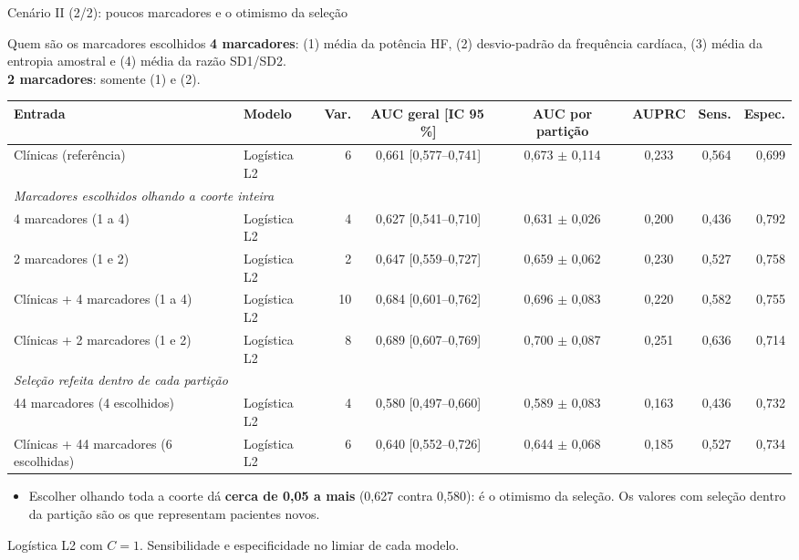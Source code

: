 \documentclass[10pt,aspectratio=169]{beamer}
\newcommand{\fonte}[1]{\par\vfill{\scriptsize\color{cinza}#1}}
\begin{document}
\begin{frame}{Cenário II (2/2): poucos marcadores e o otimismo da seleção}
  \begin{block}{Quem são os marcadores escolhidos}
    \footnotesize
    \textbf{4 marcadores}: (1) média da potência HF, (2) desvio-padrão da frequência cardíaca, (3) média da entropia amostral e (4) média da razão SD1/SD2.\\
    \textbf{2 marcadores}: somente (1) e (2).
  \end{block}
  \centering
  \scriptsize
  \setlength{\tabcolsep}{3pt}
  \begin{tabular}{llrcccrr}
    \toprule
    Entrada & Modelo & Var. & AUC geral [IC 95\,\%] & AUC por partição & AUPRC & Sens. & Espec. \\
    \midrule
    Clínicas (referência) & Logística L2 & 6 & 0,661 [0,577--0,741] & 0,673 $\pm$ 0,114 & 0,233 & 0,564 & 0,699 \\
    \midrule
    \multicolumn{8}{l}{\textit{Marcadores escolhidos olhando a coorte inteira}} \\
    4 marcadores (1 a 4) & Logística L2 & 4 & 0,627 [0,541--0,710] & 0,631 $\pm$ 0,026 & 0,200 & 0,436 & 0,792 \\
    2 marcadores (1 e 2) & Logística L2 & 2 & 0,647 [0,559--0,727] & 0,659 $\pm$ 0,062 & 0,230 & 0,527 & 0,758 \\
    Clínicas + 4 marcadores (1 a 4) & Logística L2 & 10 & 0,684 [0,601--0,762] & 0,696 $\pm$ 0,083 & 0,220 & 0,582 & 0,755 \\
    Clínicas + 2 marcadores (1 e 2) & Logística L2 & 8 & 0,689 [0,607--0,769] & 0,700 $\pm$ 0,087 & 0,251 & 0,636 & 0,714 \\
    \midrule
    \multicolumn{8}{l}{\textit{Seleção refeita dentro de cada partição}} \\
    44 marcadores (4 escolhidos) & Logística L2 & 4 & 0,580 [0,497--0,660] & 0,589 $\pm$ 0,083 & 0,163 & 0,436 & 0,732 \\
    Clínicas + 44 marcadores (6 escolhidas) & Logística L2 & 6 & 0,640 [0,552--0,726] & 0,644 $\pm$ 0,068 & 0,185 & 0,527 & 0,734 \\
    \bottomrule
  \end{tabular}
  \vspace{0.1cm}
  \begin{itemize}
    \footnotesize
    \item Escolher olhando toda a coorte dá \textbf{cerca de 0,05 a mais} (0,627
      contra 0,580): é o otimismo da seleção. Os valores com seleção dentro da
      partição são os que representam pacientes novos.
  \end{itemize}
  \fonte{Logística L2 com $C = 1$. Sensibilidade e especificidade no limiar de cada modelo.}
\end{frame}
\end{document}
